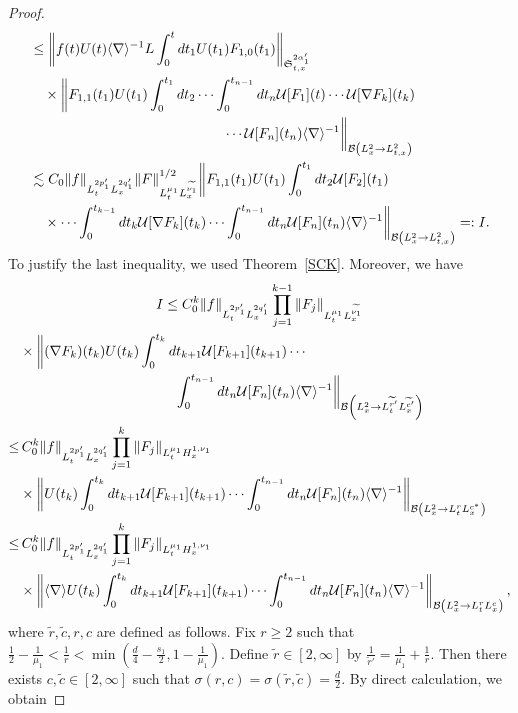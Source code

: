 \documentclass[AHL,Unicode,longabstracts,MathTools,published]{cedram}
\newcommand{\CB}{\mathcal{B}}
\newcommand{\CU}{\mathcal{U}}
\newcommand{\FS}{\mathfrak{S}}
\newcommand{\al}{\alpha}
\newcommand{\si}{\sigma}
\newcommand{\wt}{\widetilde}
\renewcommand{\No}[1]{\left\| #1 \right\|}
\newcommand{\I}{\infty}
\newcommand{\sd}{\langle \nabla \rangle}
\newcommand{\sdi}{\sd^{-1}}
\newcommand{\tx}{{t,x}}
\newcommand{\tw}{\frac{1}{2}}
\newcommand{\na}{\nabla}
\newcommand{\ls}{\lesssim}
\begin{document}
\begin{proof}
\begin{align}
& \le \No{f(t)U(t)\sdi L \int_0^t dt_1 U(t_1)F_{1,0}(t_1)}_{\FS^{2\al_1'}_\tx} \nonumber\\
&\quad \times \bigg\| F_{1,1}(t_1)U(t_1)\int_0^{t_1} dt_2 \cdots \int_0^{t_{n-1}} dt_n
\CU[F_1](t) \cdots \CU[\na F_k](t_k)\nonumber\\
&\mkern250mu \cdots \CU[F_n](t_n) \sdi \bigg\|_{\CB\left(L^2_x \to L^2_\tx\right)} \nonumber\\
&\ls C_0
\|f\|_{L^{2p_1'}_t L^{2q_1'}_x}
\|F\|_{L^{\mu_1}_t L^{\wt{\nu_1}}_x}^{1/2} \bigg\| F_{1,1}(t_1)U(t_1)
\int_0^{t_1} dt_2 \CU[F_2](t_1)\nonumber\\
&\quad \times
\cdots
\int_0^{t_{k-1}} dt_k \CU[\na F_k](t_k)
\cdots
\int_0^{t_{n-1}} dt_n \CU[F_n](t_n) \sdi\bigg\|_{\CB\left(L^2_x \to L^2_\tx\right)} =: I.\nonumber
\end{align}
\endgroup
To justify the last inequality, we used Theorem~\ref{SCK}. Moreover, we have
\begin{multline}
I \le C_0^k
\|f\|_{L^{2p_1'}_t L^{2q_1'}_x}
\prod_{j=1}^{k-1}\|F_j\|_{L^{\mu_1}_t L^{\wt{\nu_1}}_x}\\
\begin{aligned}
&\times
\bigg\| (\na F_k)(t_k) U(t_k)
\int_0^{t_k}dt_{k+1} \CU[F_{k+1}](t_{k+1})
\cdots\\
&\mkern200mu\int_0^{t_{n-1}} dt_n \CU[F_n](t_n) \sdi \bigg\|_{\CB\left(L^2_x \to L^{\wt{r}'}_t L^{\wt{c}'}_x\right)} \\
\le&\, C_0^k \|f\|_{L^{2p_1'}_t L^{2q_1'}_x}
\prod_{j=1}^k \|F_j\|_{L^{\mu_1}_t H^{1,\nu_1}_x}\\
&\times
\No{ U(t_k)
\int_0^{t_k}dt_{k+1} \CU[F_{k+1}](t_{k+1})
\cdots
\int_0^{t_{n-1}} dt_n \CU[F_n](t_n) \sdi }_{\CB\left(L^2_x \to L^r_t L^{c^*}_x\right)} \\
\le&\, C_0^k \|f\|_{L^{2p_1'}_t L^{2q_1'}_x}
\prod_{j=1}^k \|F_j\|_{L^{\mu_1}_t H^{1,\nu_1}_x}\\
&\times
\No{
\sd U(t_k)
\int_0^{t_k}dt_{k+1} \CU[F_{k+1}](t_{k+1})
\cdots
\int_0^{t_{n-1}} dt_n \CU[F_n](t_n) \sdi }_{\CB\left(L^2_x \to L^r_t L^c_x\right)},
\end{aligned}
\end{multline}
where $\wt{r},\wt{c},r,c$ are defined as follows. Fix $r \ge 2$ such that $\tw-\frac{1}{\mu_1} < \frac{1}{r} < \min(\frac{d}{4}-\frac{s_1}{2}, 1-\frac{1}{\mu_1})$. Define $\wt{r} \in [2,\I]$ by $\frac{1}{\wt{r}'}=\frac{1}{\mu_1}+\frac{1}{r}$. Then there exists $c,\wt{c} \in [2,\I]$ such that $\si(r,c) = \si(\wt{r},\wt{c}) = \frac{d}{2}$. By direct calculation, we obtain

\end{proof}
\end{document}
